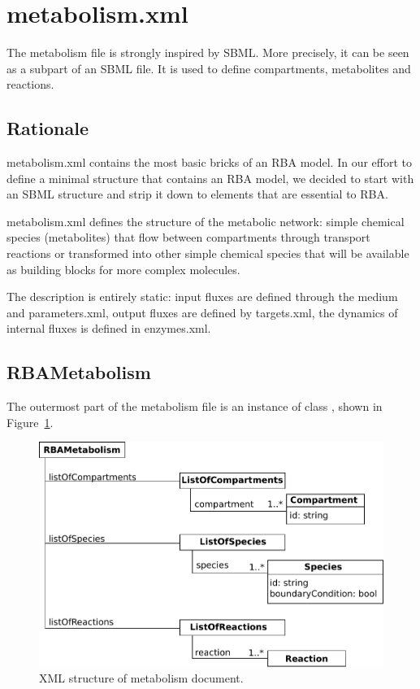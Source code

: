 
\section{metabolism.xml}

The metabolism file is strongly inspired by SBML.\@
More precisely, it can be seen as a subpart of an SBML file.
It is used to define compartments, metabolites and reactions.

\subsection{Rationale}

metabolism.xml contains the most basic bricks of an RBA model.
In our effort to define a minimal structure that contains an RBA model,
we decided to start with an SBML structure and strip it down to elements that
are essential to RBA.

metabolism.xml defines the structure of the metabolic network:
simple chemical species (metabolites) that flow between compartments through
transport reactions or transformed into other simple chemical species that
will be available as building blocks for more complex molecules.

The description is entirely static: input fluxes are defined
through the medium and parameters.xml, output fluxes are
defined by targets.xml, the dynamics of internal fluxes is
defined in enzymes.xml.

\subsection{RBAMetabolism}
\label{sec:rba_metabolism}

The outermost part of the metabolism file is an instance of class
\rbametabolism, shown in Figure~\ref{fig:metabolism_doc}.

\begin{figure}
  \centering
  \includegraphics[scale=0.8]{figures/metabolism_doc}
  \caption{XML structure of metabolism document.}
\label{fig:metabolism_doc}
\end{figure}

